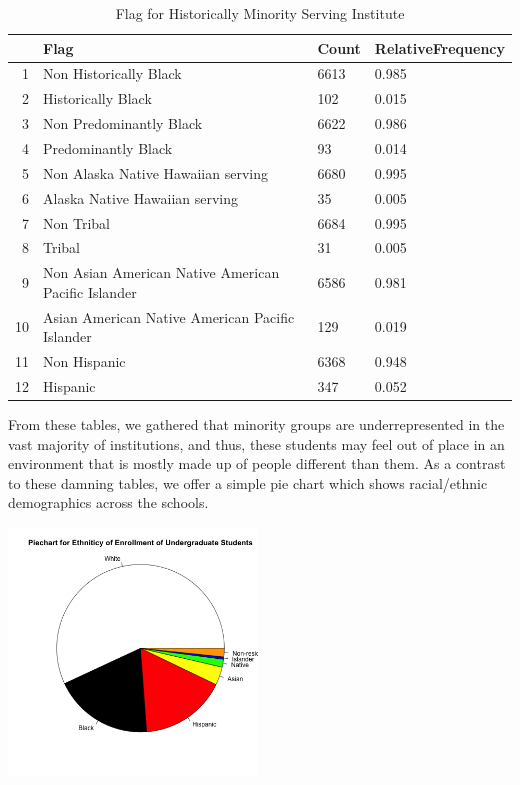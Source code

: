 \documentclass{article}\usepackage[]{graphicx}\usepackage[]{color}
\newenvironment{knitrout}{}{} %
\begin{document}
\begin{table}[ht]
\centering
\begin{tabular}{rlll}
  \hline
 & Flag & Count & RelativeFrequency \\ 
  \hline
1 & Non Historically Black & 6613 & 0.985 \\ 
  2 & Historically Black & 102 & 0.015 \\ 
  3 & Non Predominantly Black & 6622 & 0.986 \\ 
  4 & Predominantly Black & 93 & 0.014 \\ 
  5 & Non Alaska Native Hawaiian serving & 6680 & 0.995 \\ 
  6 & Alaska Native Hawaiian serving & 35 & 0.005 \\ 
  7 & Non Tribal & 6684 & 0.995 \\ 
  8 & Tribal & 31 & 0.005 \\ 
  9 & Non Asian American Native American Pacific Islander & 6586 & 0.981 \\ 
  10 & Asian American Native American Pacific Islander & 129 & 0.019 \\ 
  11 & Non Hispanic & 6368 & 0.948 \\ 
  12 & Hispanic & 347 & 0.052 \\ 
   \hline
\end{tabular}
\caption{Flag for Historically Minority Serving Institute} 
\end{table}


From these tables, we gathered that minority groups are underrepresented in the vast majority of institutions, and thus, these students may feel out of place in an environment that is mostly made up of people different than them. As a contrast to these damning tables, we offer a simple pie chart which shows racial/ethnic demographics across the schools.

\begin{knitrout}
\color{fgcolor}

{\centering \includegraphics[width=250px]{../images/piechart-enrollmentEthnicity} 

}



\end{knitrout}
\end{document}
